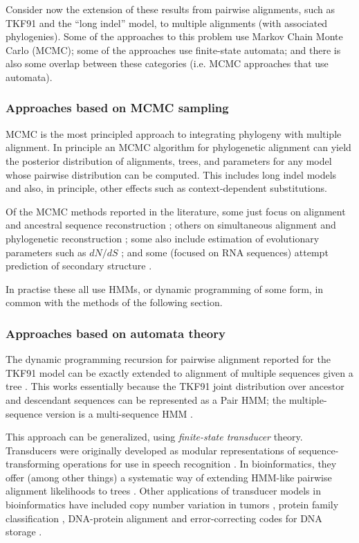 \documentclass{bmcart}
\begin{document}
Consider now the extension of these results from pairwise alignments,
such as TKF91 and the ``long indel'' model, to multiple alignments (with associated phylogenies).
Some of the approaches to this problem
use Markov Chain Monte Carlo (MCMC);
some of the approaches use finite-state automata;
and there is also some overlap between these categories (i.e. MCMC approaches that use automata).

\subsubsection*{Approaches based on MCMC sampling}

MCMC is the most principled approach to integrating phylogeny with multiple alignment.
In principle an MCMC algorithm for phylogenetic alignment can yield the posterior distribution of
alignments, trees, and parameters for any model whose pairwise distribution can be computed.
This includes long indel models and also, in principle, other effects such as context-dependent substitutions.

Of the MCMC methods reported in the literature,
some just focus on alignment and ancestral sequence reconstruction \cite{HolmesBruno2001};
others on simultaneous alignment and phylogenetic reconstruction
\cite{RedelingsSuchard2005,SuchardRedelings2006,RedelingsSuchard2007,NovakEtAl2008,BouchardCoteEtAl2009,WestessonBarquistHolmes2012};
some also include estimation of evolutionary parameters such as $dN/dS$ \cite{Redelings2014};
and some (focused on RNA sequences) attempt prediction of secondary structure \cite{ArunapuramEtAl2013,MeyerMiklos2007}.

In practise these all use HMMs, or dynamic programming of some form,
in common with the methods of the following section.

\subsubsection*{Approaches based on automata theory}

The dynamic programming recursion for pairwise alignment reported for the TKF91 model \cite{ThorneEtal91}
can be exactly extended to alignment of multiple sequences given a tree \cite{Hein2001,LunterSongMiklosHein2003}.
This works essentially because the TKF91 joint distribution over ancestor and descendant sequences
can be represented as a Pair HMM;
the multiple-sequence version is a multi-sequence HMM \cite{HolmesBruno2001}.

This approach can be generalized, using {\em finite-state transducer} theory.
Transducers were originally developed as modular representations of sequence-transforming operations
for use in speech recognition \cite{MohriPereiraRiley2000}.
In bioinformatics, they offer (among other things)
a systematic way of extending HMM-like pairwise alignment likelihoods to trees
\cite{pmid7584457,WestessonEtAl2012,BouchardCote2013,IndelHistorian}.
Other applications of transducer models in bioinformatics have included
copy number variation in tumors \cite{pmid24743184},
protein family classification \cite{pmid12804091},
DNA-protein alignment \cite{pmid15123596}
and error-correcting codes for DNA storage \cite{DBLP:journals/corr/Holmes16}.
\end{document}

